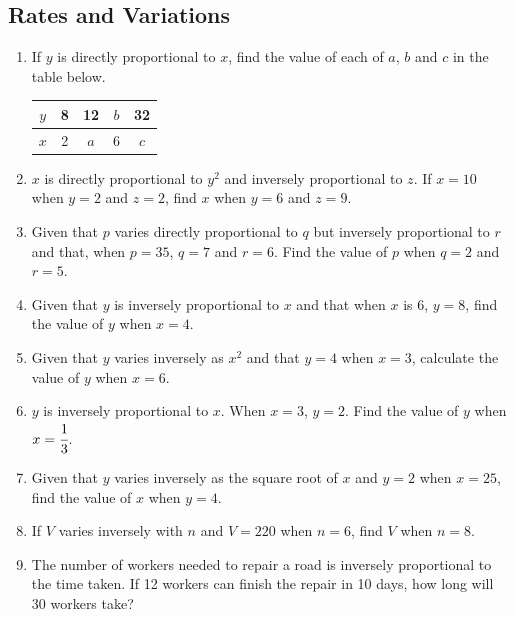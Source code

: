 	\subsection{Rates and Variations}
\begin{enumerate}

		\subsubsection{Variations}
	\item If $y$ is directly proportional to $x$, find the value of each of $a$, $b$ and $c$ in the table below.\\
	\begin{tabular}{|c|c|c|c|c|} \hline
	$y$ & 8 & 12 & $b$ & 32 \\ \hline
	$x$ & 2 & $a$ & 6 & $c$ \\ \hline
	\end{tabular}

	\item $x$ is directly proportional to $y^2$ and inversely proportional to $z$. If $x = 10$ when $y = 2$ and $z = 2$, find $x$ when $y = 6$ and $z = 9$.
	
	\item Given that $p$ varies directly proportional to $q$ but inversely proportional to $r$ and that, when $p = 35$, $q = 7$ and $r = 6$. Find the value of $p$ when $q = 2$ and $r =5$.
	
	\item Given that $y$ is inversely proportional to $x$ and that when $x$ is 6, $y = 8$, find the value of $y$ when $x = 4$.
	
	\item Given that $y$ varies inversely as $x^2$ and that $y = 4$ when $x = 3$, calculate the value of $y$ when $x = 6$.
	
	\item $y$ is inversely proportional to $x$. When $x = 3$, $y = 2$. Find the value of $y$ when $x = \cfrac{1}{3}$.
	
	\item Given that $y$ varies inversely as the square root of $x$ and $y = 2$ when $x = 25$, find the value of $x$ when $y = 4$.
	
	\item If $V$ varies inversely with $n$ and $V = 220$ when $n = 6$, find $V$ when $n = 8$.
	
	\item The number of workers needed to repair a road is inversely proportional to the time taken. If 12 workers can finish the repair in 10 days, how long will 30 workers take?
	

\end{enumerate}
